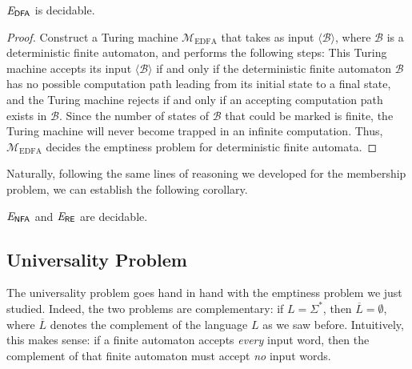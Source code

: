\begin{theorem}\label{thm:EDFAdecidable}
$\mathit{E}_{\textsf{DFA}}$ is decidable.

\begin{proof}
Construct a Turing machine $\mathcal{M}_{\mathrm{EDFA}}$ that takes as input $\langle \mathcal{B} \rangle$, where $\mathcal{B}$ is a deterministic finite automaton, and performs the following steps:
This Turing machine accepts its input $\langle \mathcal{B} \rangle$ if and only if the deterministic finite automaton $\mathcal{B}$ has no possible computation path leading from its initial state to a final state, and the Turing machine rejects if and only if an accepting computation path exists in $\mathcal{B}$. Since the number of states of $\mathcal{B}$ that could be marked is finite, the Turing machine will never become trapped in an infinite computation. Thus, $\mathcal{M}_{\mathrm{EDFA}}$ decides the emptiness problem for deterministic finite automata.
\end{proof}
\end{theorem}

Naturally, following the same lines of reasoning we developed for the membership problem, we can establish the following corollary.

\begin{corollary}
$\mathit{E}_{\textsf{NFA}}$ and $\mathit{E}_{\textsf{RE}}$ are decidable.
\end{corollary}

\subsection*{Universality Problem}

The universality problem goes hand in hand with the emptiness problem we just studied. Indeed, the two problems are complementary: if $L = \Sigma^{*}$, then $\overline{L} = \emptyset$, where $\overline{L}$ denotes the complement of the language $L$ as we saw before. Intuitively, this makes sense: if a finite automaton accepts \emph{every} input word, then the complement of that finite automaton must accept \emph{no} input words.

